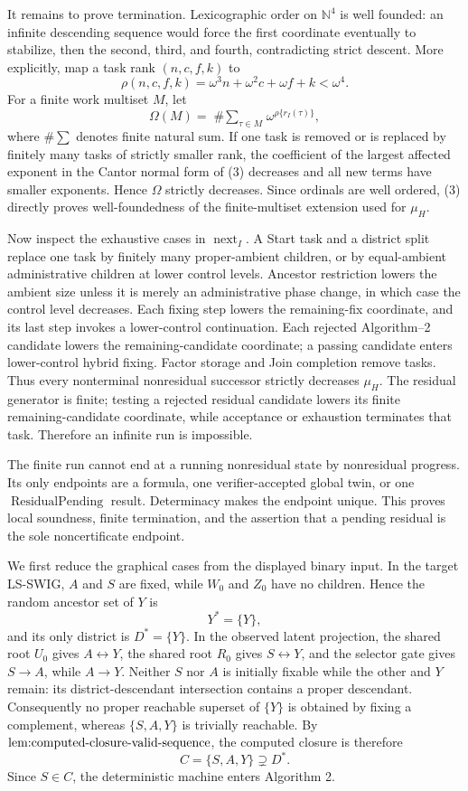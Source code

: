 It remains to prove termination.  Lexicographic order on \(\mathbb N^4\) is well founded: an infinite descending sequence would force the first coordinate eventually to stabilize, then the second, third, and fourth, contradicting strict descent.  More explicitly, map a task rank \((n,c,f,k)\) to
\[
 \rho(n,c,f,k)=\omega^3n+\omega^2c+\omega f+k<\omega^4.
\tag{2}
\]
For a finite work multiset \(M\), let
\[
 \Omega(M)=\mathop{\#\!\sum}_{\tau\in M}
 \omega^{\rho\{r_I(\tau)\}},
\tag{3}
\]
where \(\#\!\sum\) denotes finite natural sum.  If one task is removed or is replaced by finitely many tasks of strictly smaller rank, the coefficient of the largest affected exponent in the Cantor normal form of (3) decreases and all new terms have smaller exponents.  Hence \(\Omega\) strictly decreases.  Since ordinals are well ordered, (3) directly proves well-foundedness of the finite-multiset extension used for \(\mu_H\).

Now inspect the exhaustive cases in \(\operatorname{next}_I\).  A Start task and a district split replace one task by finitely many proper-ambient children, or by equal-ambient administrative children at lower control levels.  Ancestor restriction lowers the ambient size unless it is merely an administrative phase change, in which case the control level decreases.  Each fixing step lowers the remaining-fix coordinate, and its last step invokes a lower-control continuation.  Each rejected Algorithm--2 candidate lowers the remaining-candidate coordinate; a passing candidate enters lower-control hybrid fixing.  Factor storage and Join completion remove tasks.  Thus every nonterminal nonresidual successor strictly decreases \(\mu_H\).  The residual generator is finite; testing a rejected residual candidate lowers its finite remaining-candidate coordinate, while acceptance or exhaustion terminates that task.  Therefore an infinite run is impossible.

The finite run cannot end at a running nonresidual state by nonresidual progress.  Its only endpoints are a formula, one verifier-accepted global twin, or one \(\operatorname{ResidualPending}\) result.  Determinacy makes the endpoint unique.  This proves local soundness, finite termination, and the assertion that a pending residual is the sole noncertificate endpoint.

We first reduce the graphical cases from the displayed binary input.  In the target LS-SWIG, \(A\) and \(S\) are fixed, while \(W_0\) and \(Z_0\) have no children.  Hence the random ancestor set of \(Y\) is
\[
 Y^*=\{Y\},
\]
and its only district is \(D^*=\{Y\}\).  In the observed latent projection, the shared root \(U_0\) gives \(A\leftrightarrow Y\), the shared root \(R_0\) gives \(S\leftrightarrow Y\), and the selector gate gives \(S\to A\), while \(A\to Y\).  Neither \(S\) nor \(A\) is initially fixable while the other and \(Y\) remain: its district-descendant intersection contains a proper descendant.  Consequently no proper reachable superset of \(\{Y\}\) is obtained by fixing a complement, whereas \(\{S,A,Y\}\) is trivially reachable.  By \(\textnormal{lem:computed-closure-valid-sequence}\), the computed closure is therefore
\[
 C=\{S,A,Y\}\supsetneq D^*.
\tag{1}
\]
Since \(S\in C\), the deterministic machine enters Algorithm 2.


